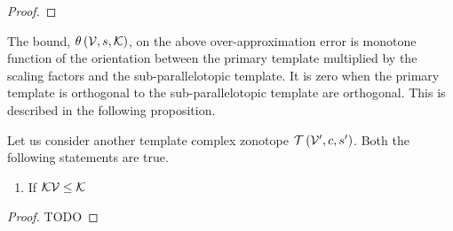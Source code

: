%
\begin{proof}

\end{proof}
%
The bound, $\theta\left(\mathcal{V},s,\mathcal{K}\right)$, on the above
over-approximation error is monotone function of the orientation
between the primary template multiplied by the scaling factors and the
sub-parallelotopic template.  It is zero when the primary template is
orthogonal to the sub-parallelotopic template are orthogonal.  This is
described in the following proposition.
%
\begin{proposition}
  Let us consider another template complex zonotope
  $\mathit{\operatorname{\mathcal{T}}}\left(\mathcal{V}^\prime,c,s^\prime\right)$.  Both the following
  statements are true.
\begin{enumerate}
\item  If $\mathcal{K}\mathcal{V}\leq\mathcal{K}$ 
\end{enumerate}
%
\end{proposition}
%
\begin{proof}
{\color{red} TODO}
\end{proof}
%
